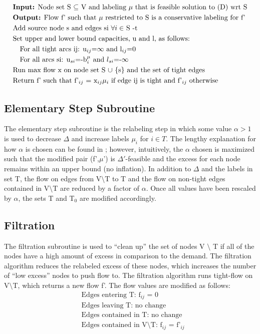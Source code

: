 \documentclass[11pt]{article}
\theoremstyle{definition}
\theoremstyle{definition}
\begin{document}
	\begin{align*}
	&\text{\textbf{Input:} Node set S $\subseteq$ V and labeling $\mu$ that is feasible solution to (D) wrt S} \\
	&\text{\textbf{Output:} Flow f' such that $\mu$ restricted to S is a conservative labeling for f'} \\
	&\text{Add source node s and edges si $\forall i \in$ S -t} \\
	&\text{Set upper and lower bound capacities, u and l, as follows: } \\
	&\quad \text{For all tight arcs ij: u$_{ij}$=$\infty$ and l$_{ij}$=0} \\
	&\quad \text{For all arcs si: u$_{si}$=-b$_i^\mu$ and $l_{si}$=-$\infty$} \\
	&\text{Run max flow x on node set S $\cup$ $\{$s$\}$ and the set of tight edges} \\
	&\text{Return f' such that f'$_{ij}$ = x$_{ij}\mu_i$ if edge ij is tight and f'$_{ij}$ otherwise}
	\end{align*}
	
	\subsection{Elementary Step Subroutine}
	The elementary step subroutine is the relabeling step in which some value $\alpha > 1$ is used to decrease $\Delta$ and increase labels $\mu_i$ for $i \in T$. The lengthy explanation for how $\alpha$ is chosen can be found in \cite{article}; however, intuitively, the $\alpha$ chosen is maximized such that the modified pair (f',$\mu$') is $\Delta'$-feasible and the excess for each node remains within an upper bound (no inflation). In addition to $\Delta$ and the labels in set T, the flow on edges from V$\setminus$T to T and the flow on non-tight edges contained in V$\setminus$T are reduced by a factor of $\alpha$. Once all values have been rescaled by $\alpha$, the sets T and T$_0$ are modified accordingly.  
	
	\subsection{Filtration}
	The filtration subroutine is used to ``clean up'' the set of nodes V $\setminus$ T if all of the nodes have a high amount of excess in comparison to the demand. The filtration algorithm reduces the relabeled excess of these nodes, which increases the number of ``low excess'' nodes to push flow to. The filtration algorithm runs tight-flow on V$\setminus$T, which returns a new flow f'. The flow values are modified as follows: 
	\begin{align*}
	&\text{Edges entering T: f$_{ij}$ = 0} \\ 
	&\text{Edges leaving T: no change} \\
	&\text{Edges contained in T: no change} \\
	&\text{Edges contained in V$\setminus$T: f$_{ij}$ = f'$_{ij}$}
	\end{align*}
	
\end{document}
